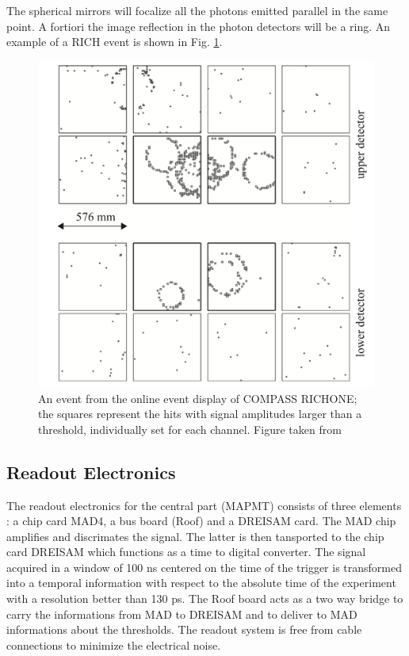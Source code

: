The spherical mirrors will focalize all the photons emitted parallel in the same point. A fortiori the image reflection in the photon detectors will be a ring. An example of a RICH event is shown in Fig. \ref{pic:RICHEvent}.

\begin{figure}[!h]
  \centering
	\includegraphics[scale=0.5]{./gfx/RICHEvent.png}
	\caption{An event from the online event display of COMPASS RICHONE; the squares represent the hits with signal amplitudes larger than a threshold, individually set for each channel. Figure taken from \cite{NIM}}
	\label{pic:RICHEvent}
\end{figure}

\subsection{Readout Electronics}

The readout electronics for the central part (MAPMT) consists of three elements : a chip card MAD4, a bus board (Roof) and a DREISAM card. The MAD chip amplifies and discrimates the signal. The latter is then tansported to the chip card DREISAM which functions as a time to digital converter. The signal acquired in a window of 100 ns centered on the time of the trigger is transformed into a temporal information with respect to the absolute time of the experiment with a resolution better than 130 ps. The Roof board acts as a two way bridge to carry the informations from MAD to DREISAM and to deliver to MAD informations about the thresholds. The readout system is free from cable connections to minimize the electrical noise.

